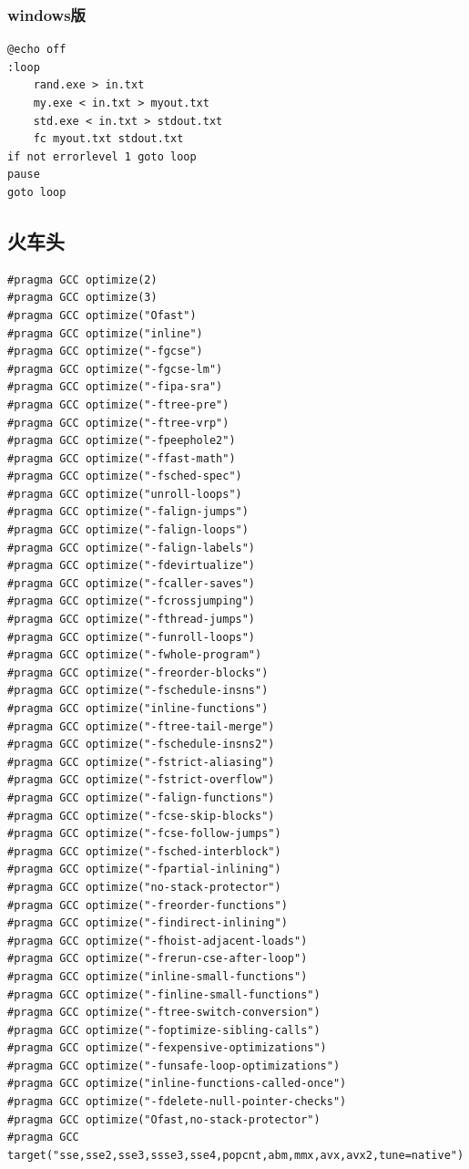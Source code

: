 \documentclass[a4]{ctexart}
\begin{document}
\subsubsection{windows版}
\begin{lstlisting}
@echo off  
:loop  
    rand.exe > in.txt
    my.exe < in.txt > myout.txt
    std.exe < in.txt > stdout.txt
    fc myout.txt stdout.txt
if not errorlevel 1 goto loop  
pause
goto loop
\end{lstlisting}
\subsection{火车头}
\begin{lstlisting}
#pragma GCC optimize(2)
#pragma GCC optimize(3)
#pragma GCC optimize("Ofast")
#pragma GCC optimize("inline")
#pragma GCC optimize("-fgcse")
#pragma GCC optimize("-fgcse-lm")
#pragma GCC optimize("-fipa-sra")
#pragma GCC optimize("-ftree-pre")
#pragma GCC optimize("-ftree-vrp")
#pragma GCC optimize("-fpeephole2")
#pragma GCC optimize("-ffast-math")
#pragma GCC optimize("-fsched-spec")
#pragma GCC optimize("unroll-loops")
#pragma GCC optimize("-falign-jumps")
#pragma GCC optimize("-falign-loops")
#pragma GCC optimize("-falign-labels")
#pragma GCC optimize("-fdevirtualize")
#pragma GCC optimize("-fcaller-saves")
#pragma GCC optimize("-fcrossjumping")
#pragma GCC optimize("-fthread-jumps")
#pragma GCC optimize("-funroll-loops")
#pragma GCC optimize("-fwhole-program")
#pragma GCC optimize("-freorder-blocks")
#pragma GCC optimize("-fschedule-insns")
#pragma GCC optimize("inline-functions")
#pragma GCC optimize("-ftree-tail-merge")
#pragma GCC optimize("-fschedule-insns2")
#pragma GCC optimize("-fstrict-aliasing")
#pragma GCC optimize("-fstrict-overflow")
#pragma GCC optimize("-falign-functions")
#pragma GCC optimize("-fcse-skip-blocks")
#pragma GCC optimize("-fcse-follow-jumps")
#pragma GCC optimize("-fsched-interblock")
#pragma GCC optimize("-fpartial-inlining")
#pragma GCC optimize("no-stack-protector")
#pragma GCC optimize("-freorder-functions")
#pragma GCC optimize("-findirect-inlining")
#pragma GCC optimize("-fhoist-adjacent-loads")
#pragma GCC optimize("-frerun-cse-after-loop")
#pragma GCC optimize("inline-small-functions")
#pragma GCC optimize("-finline-small-functions")
#pragma GCC optimize("-ftree-switch-conversion")
#pragma GCC optimize("-foptimize-sibling-calls")
#pragma GCC optimize("-fexpensive-optimizations")
#pragma GCC optimize("-funsafe-loop-optimizations")
#pragma GCC optimize("inline-functions-called-once")
#pragma GCC optimize("-fdelete-null-pointer-checks")
#pragma GCC optimize("Ofast,no-stack-protector")
#pragma GCC target("sse,sse2,sse3,ssse3,sse4,popcnt,abm,mmx,avx,avx2,tune=native")
\end{lstlisting}
\end{document}
